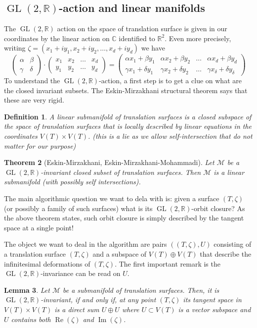 \documentclass[a4paper,12pt]{article}
\def\bC{\mathbb{C}}
\def\bR{\mathbb{R}}
\def\cM{\mathcal{M}}
\def\Re{\operatorname{Re}}
\def\Im{\operatorname{Im}}
\def\GL{\operatorname{GL}}
\newtheorem{definition}{Definition}
\newtheorem{lemma}[definition]{Lemma}
\newtheorem{theorem}[definition]{Theorem}
\begin{document}
\subsection{$\GL(2,\bR)$-action and linear manifolds}
The $\GL(2,\bR)$ action on the space of translation surface is given in our
coordinates by the linear action on $\bC$ identified to $\bR^2$. Even more
precisely, writing $\zeta = (x_1 + i y_1, x_2 + i y_2, \ldots, x_d + i y_d)$ we have
\[
\begin{pmatrix}
\alpha & \beta \\
\gamma & \delta
\end{pmatrix}
\cdot
\begin{pmatrix}
x_1 & x_2 & \ldots & x_d \\
y_1 & y_2 & \ldots & y_d
\end{pmatrix}
=
\begin{pmatrix}
\alpha x_1 + \beta y_1 & \alpha x_2 + \beta y_2 & \ldots & \alpha x_d + \beta y_d \\
\gamma x_1 + \delta y_1 & \gamma x_2 + \delta y_2 & \ldots & \gamma x_\delta + \delta y_\delta
\end{pmatrix}
\]
To understand the $\GL(2,\bR)$-action, a first step is to get a clue on what
are the closed invariant subsets. The Eskin-Mirzakhani structural theorem
says that these are very rigid.
\begin{definition}
A \emph{linear submanifold} of translation surfaces is a closed subspace of the
space of translation surfaces that is locally described by linear equations
in the coordinates $V(T) \times V(T)$.
(this is a lie as we allow self-intersection that do not matter for our purpose)
\end{definition}

\begin{theorem}[Eskin-Mirzakhani, Eskin-Mirzakhani-Mohammadi]
Let $\cM$ be a $\GL(2,\bR)$-invariant closed subset of translation surfaces. Then
$\cM$ is a linear submanifold (with possibly self intersections).
\end{theorem}

The main algorithmic question we want to dela with is: given a surface $(T, \zeta)$
(or possibly a family of such surfaces) what is its $\GL(2,\bR)$-orbit closure? As the
above theorem states, such orbit closure is simply described by the tangent space
at a single point!

The object we want to deal in the algorithm are pairs $((T,\zeta), U)$
consisting of a translation surface $(T,\zeta)$ and a subspace of $V(T) \oplus
V(T)$ that describe the infinitesimal deformations of $(T, \zeta)$.
The first important remark is the $\GL(2,\bR)$-invariance can be read on $U$.
\begin{lemma}
Let $\cM$ be a submanifold of translation surfaces. Then, it is
$\GL(2,\bR)$-invariant, if and only if, at any point $(T, \zeta)$ its tangent
space in $V(T) \times V(T)$ is a direct sum $U \oplus U$ where $U \subset V(T)$
is a vector subspace and $U$ contains both $\Re(\zeta)$ and $\Im(\zeta)$.
\end{lemma}
\end{document}
